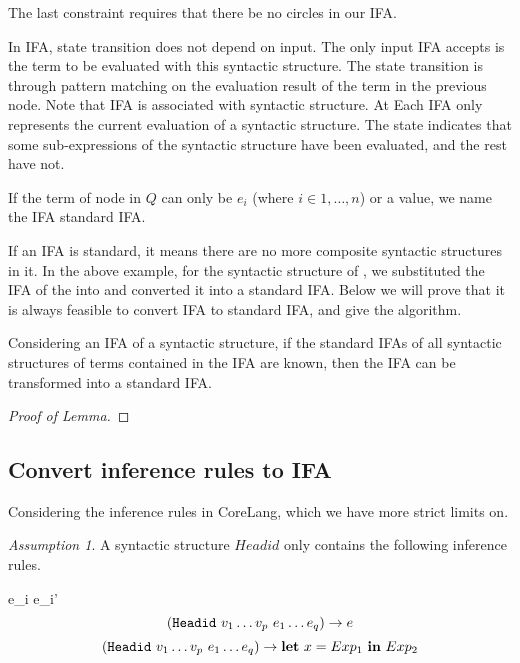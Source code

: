 The last constraint requires that there be no circles in our IFA. 

In IFA, state transition does not depend on input. The only input IFA accepts is the term to be evaluated with this syntactic structure. The state transition is through pattern matching on the evaluation result of the term in the previous node. Note that IFA is associated with syntactic structure. At Each IFA only represents the current evaluation of a syntactic structure. The state indicates that some 
sub-expressions of the syntactic structure have been evaluated, and the rest have not.

\begin{Def}

If the term of node in $Q$ can only be $e_i$ (where $i \in {1,\ldots,n}$) or a value, we name the IFA standard IFA. 

\end{Def}

If an IFA is standard, it means there are no more composite syntactic structures in it. In the above example, for the syntactic structure of , we substituted the IFA of the  into  and converted it into a standard IFA. Below we will prove that it is always feasible to convert IFA to standard IFA, and give the algorithm.

\begin{lemma}
Considering an IFA of a syntactic structure, if the standard IFAs of all syntactic structures of terms contained in the IFA are known, then the IFA can be transformed into a standard IFA.
\end{lemma}

\begin{proof}[Proof of Lemma]

\end{proof}

\subsection{Convert inference rules to IFA}

Considering the inference rules in CoreLang, which we have more strict limits on. 

\textit{Assumption 1}. A syntactic structure $Headid$ only contains the following inference rules.

{e_i \to e_i'}
\[(\mbox{\tt Headid}~v_1 \ldots v_p~e_1 \ldots e_q) \to e \]
\[(\mbox{\tt Headid}~v_1 \ldots v_p~e_1 \ldots e_q) \to \mbox{\rm \bf let}~x= Exp_1~\mbox{\rm \bf in}~Exp_2 \]

